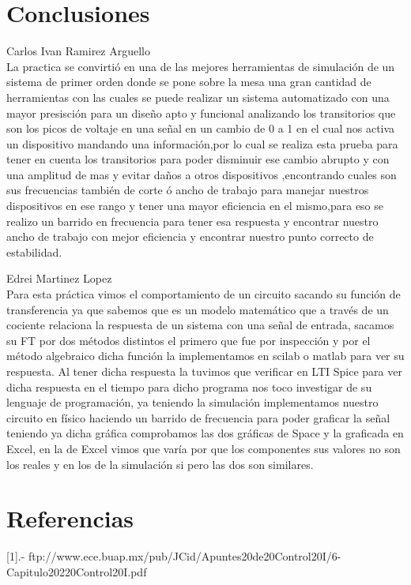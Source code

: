 \documentclass[12pt]{report}
\begin{document}
\chapter{Conclusiones}
Carlos Ivan Ramirez Arguello\\
La practica se convirtió en una de las mejores herramientas de simulación de un sistema de primer orden donde se pone sobre la mesa una gran cantidad de herramientas con las cuales se puede realizar un sistema automatizado con una mayor presisción para un diseño apto y funcional analizando los transitorios que son los picos de voltaje en una señal en un cambio de 0 a 1 en el cual nos activa un dispositivo mandando una información,por lo cual se realiza esta prueba para tener en cuenta los transitorios para poder disminuir ese cambio abrupto y con una amplitud de mas y evitar daños a otros dispositivos ,encontrando cuales son sus frecuencias también de corte ó ancho de trabajo para manejar nuestros dispositivos en ese rango y tener una mayor eficiencia en el mismo,para eso se realizo un barrido en frecuencia para tener esa respuesta y encontrar nuestro ancho de trabajo con mejor eficiencia y encontrar nuestro punto correcto de estabilidad.

Edrei Martinez Lopez\\
Para esta práctica vimos el comportamiento de un circuito sacando su función de transferencia ya que sabemos que es un modelo matemático que a través de un cociente relaciona la respuesta de un sistema con una señal de entrada, sacamos su FT por dos métodos distintos el primero que fue por inspección y por el método algebraico dicha función la implementamos en scilab o matlab para ver su respuesta. Al tener dicha respuesta la tuvimos que verificar en LTI Spice para ver dicha respuesta en el tiempo para dicho programa nos toco investigar de su lenguaje de programación, ya teniendo la simulación  implementamos nuestro circuito en físico haciendo un barrido de frecuencia para poder graficar la señal teniendo ya dicha gráfica comprobamos las dos gráficas de Space y la graficada en Excel, en la de Excel vimos que varía por que los componentes sus valores no son los reales y en los de la simulación si pero las dos son similares.
\chapter{Referencias}
[1].-  ftp://www.ece.buap.mx/pub/JCid/Apuntes20de20Control20I/6-Capitulo20220Control20I.pdf
\end{document}

